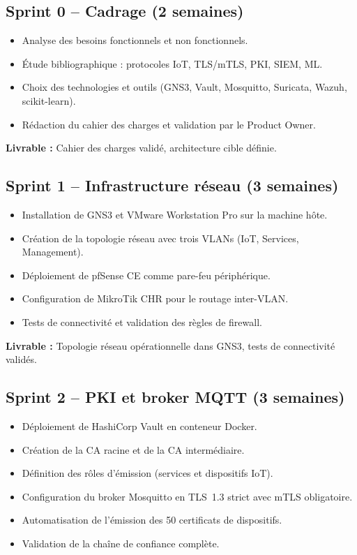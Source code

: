 \subsection{Sprint 0 -- Cadrage (2 semaines)}

\begin{itemize}
  \item Analyse des besoins fonctionnels et non fonctionnels.
  \item Étude bibliographique : protocoles IoT, TLS/mTLS, PKI, SIEM, ML.
  \item Choix des technologies et outils (GNS3, Vault, Mosquitto, Suricata, Wazuh, scikit-learn).
  \item Rédaction du cahier des charges et validation par le Product Owner.
\end{itemize}

\textbf{Livrable :} Cahier des charges validé, architecture cible définie.

\subsection{Sprint 1 -- Infrastructure réseau (3 semaines)}

\begin{itemize}
  \item Installation de GNS3 et VMware Workstation Pro sur la machine hôte.
  \item Création de la topologie réseau avec trois VLANs (IoT, Services, Management).
  \item Déploiement de pfSense CE comme pare-feu périphérique.
  \item Configuration de MikroTik CHR pour le routage inter-VLAN.
  \item Tests de connectivité et validation des règles de firewall.
\end{itemize}

\textbf{Livrable :} Topologie réseau opérationnelle dans GNS3, tests de connectivité validés.

\subsection{Sprint 2 -- PKI et broker MQTT (3 semaines)}

\begin{itemize}
  \item Déploiement de HashiCorp Vault en conteneur Docker.
  \item Création de la CA racine et de la CA intermédiaire.
  \item Définition des rôles d'émission (services et dispositifs IoT).
  \item Configuration du broker Mosquitto en TLS~1.3 strict avec mTLS obligatoire.
  \item Automatisation de l'émission des 50 certificats de dispositifs.
  \item Validation de la chaîne de confiance complète.
\end{itemize}


